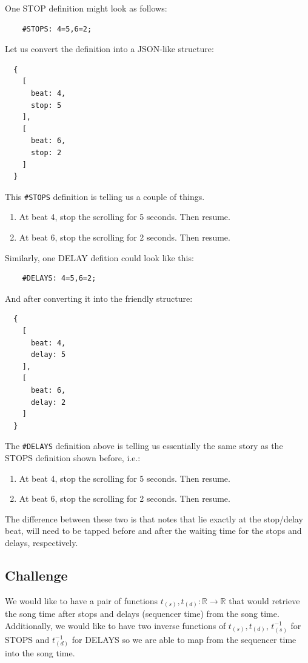 \documentclass[a4paper,9pt]{article}
\begin{document}
One STOP definition might look as follows:

\begin{verbatim}
    #STOPS: 4=5,6=2;
\end{verbatim}

Let us convert the definition into a JSON-like structure:

    \begin{verbatim}
  {
    [
      beat: 4,
      stop: 5 
    ],
    [
      beat: 6,
      stop: 2 
    ]
  }
    \end{verbatim}

    This \texttt{\#STOPS} definition is telling us a couple of things.
    \begin{enumerate}
	    \item At beat 4, stop the scrolling for 5 seconds. Then resume.
	    \item At beat 6, stop the scrolling for 2 seconds. Then resume.
    \end{enumerate}

Similarly, one DELAY defition could look like this:
\begin{verbatim}
    #DELAYS: 4=5,6=2;
\end{verbatim}

And after converting it into the friendly structure:

    \begin{verbatim}
  {
    [
      beat: 4,
      delay: 5 
    ],
    [
      beat: 6,
      delay: 2 
    ]
  }
    \end{verbatim}
    The \texttt{\#DELAYS} definition above is telling us essentially the same story as the STOPS definition shown before, i.e.: 
    \begin{enumerate}
	    \item At beat 4, stop the scrolling for 5 seconds. Then resume.
	    \item At beat 6, stop the scrolling for 2 seconds. Then resume.
    \end{enumerate}

    The difference between these two is that notes that lie exactly at the stop/delay beat, will need to be tapped before and after the waiting time for the stops and delays, respectively.
    \subsection{Challenge}

    We would like to have a pair of functions $ t_{(s)}, t_{(d)}: \mathbb{R} \rightarrow \mathbb{R} $ that would retrieve the song time after stops and delays (sequencer time) from the song time. Additionally, we would like to have two inverse functions of $ t_{(s)}, t_{(d)} $, $ t^{-1}_{(s)} $ for STOPS and $ t^{-1}_{(d)} $ for DELAYS so we are able to map from the sequencer time into the song time.
\end{document}
